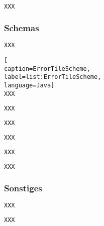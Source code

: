 \begin{lstlisting}[caption=InputTileType,label=list:InputTileType,language=Java]
XXX
\end{lstlisting}    

\subsubsection{Schemas}

\begin{lstlisting}[caption=ActionTileScheme,label=list:ActionTileScheme,language=Java]
XXX
\end{lstlisting}    

\begin{lstlisting}[
caption=ErrorTileScheme,
label=list:ErrorTileScheme,
language=Java]
XXX
\end{lstlisting}    

\begin{lstlisting}[caption=HistoryTileScheme,label=list:HistoryTileScheme,language=Java]
XXX
\end{lstlisting}    

\begin{lstlisting}[caption=OperandTileScheme,label=list:OperandTileScheme,language=Java]
XXX
\end{lstlisting}    

\begin{lstlisting}[caption=SettingTileScheme,label=list:SettingTileScheme,language=Java]
XXX
\end{lstlisting}    

\begin{lstlisting}[caption=StackTileScheme,label=list:StackTileScheme,language=Java]
XXX
\end{lstlisting}    

\begin{lstlisting}[caption=TileScheme,label=list:TileScheme,language=Java]
XXX
\end{lstlisting}

\subsubsection{Sonstiges}

\begin{lstlisting}[caption=Tile,label=list:Tile,language=Java]
XXX
\end{lstlisting}    

\begin{lstlisting}[caption=TileMapping,label=list:TileMapping,language=Java]
XXX
\end{lstlisting}    

